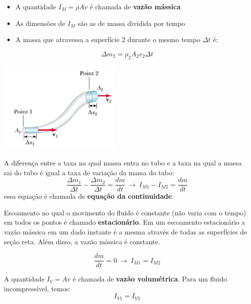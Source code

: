 \documentclass[t,%
brazilian,%
11pt,%
aspectratio=169,%
table%
]{beamer}
\begin{document}
\begin{frame}
    \begin{itemize}
        \item A quantidade $I_M=\rho A v$ é chamada de \textbf{vazão mássica}
        \item As dimensões de $I_M$ são as de massa dividida por tempo
        \item A massa que atravessa a superfície 2 durante o mesmo tempo $\Delta t$ é:
    \end{itemize}
    \[
        \Delta m_2 = \rho_2 A_2 v_2 \Delta t
    \]
    \begin{center}
        \includegraphics[width=0.45\textwidth]{images/tuboS}
    \end{center}
\end{frame}

\begin{frame}[c]
    A diferença entre a taxa na qual massa entra no tubo e a taxa na qual a massa
    sai do tubo é igual a taxa de variação da massa do tubo:
    \[
        \frac{\Delta m_1}{\Delta t} - \frac{\Delta m_2}{\Delta t} = \frac{dm}{dt} ~\rightarrow~ I_{M1}-I_{M2} = \frac{dm}{dt}
    \]
    essa equação é chamada de \textbf{equação da continuidade}.
\end{frame}

\begin{frame}
    Escoamento no qual o movimento do fluido é constante (não varia com o tempo) em
    todos os pontos é chamado \textbf{estacionário}. Em um escoamento estacionário
    a vazão mássica em um dado instante é a mesma através de todas as superfícies
    de seção reta. Além disso, a vazão mássica é constante.

    \[
        \frac{dm}{dt}=0 ~\rightarrow~ I_{M1}=I_{M2}
    \]

    A quantidade $I_V = Av$ é chamada de \textbf{vazão volumétrica}. Para um fluido incompressível, temos:
    \[
        I_{V1}=I_{V2}
    \]
\end{frame}

\end{document}
